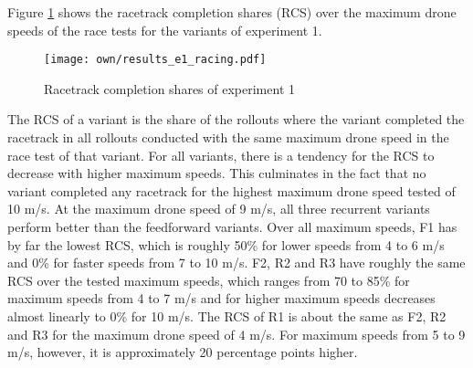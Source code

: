 Figure \ref{fig:e1_rcs} shows the racetrack completion shares (RCS)
over the maximum drone speeds of the race tests for the variants of experiment 1.
\begin{figure}
    \centering
    \texttt{[image: own/results\_e1\_racing.pdf]}
    \caption[
        Racetrack completion shares of experiment 1
    ]{
        Racetrack completion shares of experiment 1
    \label{fig:e1_rcs}}
\end{figure}
The RCS of a variant is the share of the rollouts 
where the variant completed the racetrack
in all rollouts conducted with the same maximum drone speed in the race test of that variant.
For all variants, there is a tendency for the RCS to decrease with higher maximum speeds.
This culminates in the fact that no variant completed any racetrack 
for the highest maximum drone speed tested of 10 m/s.
At the maximum drone speed of 9 m/s, all three recurrent variants
perform better than the feedforward variants.
Over all maximum speeds, F1 has by far the lowest RCS,
which is roughly 50\% for lower speeds from 4 to 6 m/s
and 0\% for faster speeds from 7 to 10 m/s.
F2, R2 and R3 have roughly the same RCS over the tested maximum speeds,
which ranges from 70 to 85\% for maximum speeds from 4 to 7 m/s
and for higher maximum speeds decreases almost linearly to 0\% for 10 m/s.
The RCS of R1 is about the same as F2, R2 and R3
for the maximum drone speed of 4 m/s.
For maximum speeds from 5 to 9 m/s, however,
it is approximately 20 percentage points higher.





